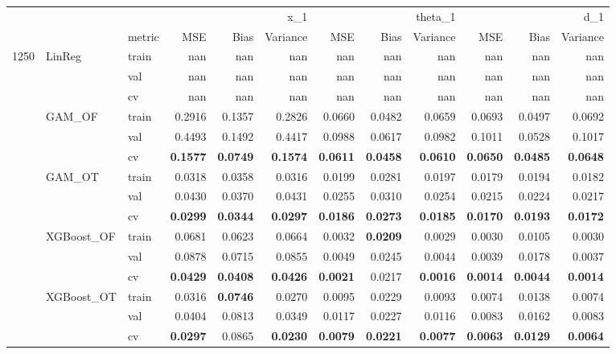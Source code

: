 \begin{tabular}{lllrrrrrrrrr}
 &  &  & \multicolumn{3}{r}{x_1} & \multicolumn{3}{r}{theta_1} & \multicolumn{3}{r}{d_1} \\
 &  & metric & MSE & Bias & Variance & MSE & Bias & Variance & MSE & Bias & Variance \\
\multirow[c]{15}{*}{1250} & \multirow[c]{3}{*}{LinReg} & train & nan & nan & nan & nan & nan & nan & nan & nan & nan \\
 &  & val & nan & nan & nan & nan & nan & nan & nan & nan & nan \\
 &  & cv & nan & nan & nan & nan & nan & nan & nan & nan & nan \\
 & \multirow[c]{3}{*}{GAM_OF} & train & 0.2916 & 0.1357 & 0.2826 & 0.0660 & 0.0482 & 0.0659 & 0.0693 & 0.0497 & 0.0692 \\
 &  & val & 0.4493 & 0.1492 & 0.4417 & 0.0988 & 0.0617 & 0.0982 & 0.1011 & 0.0528 & 0.1017 \\
 &  & cv & \bfseries 0.1577 & \bfseries 0.0749 & \bfseries 0.1574 & \bfseries 0.0611 & \bfseries 0.0458 & \bfseries 0.0610 & \bfseries 0.0650 & \bfseries 0.0485 & \bfseries 0.0648 \\
 & \multirow[c]{3}{*}{GAM_OT} & train & 0.0318 & 0.0358 & 0.0316 & 0.0199 & 0.0281 & 0.0197 & 0.0179 & 0.0194 & 0.0182 \\
 &  & val & 0.0430 & 0.0370 & 0.0431 & 0.0255 & 0.0310 & 0.0254 & 0.0215 & 0.0224 & 0.0217 \\
 &  & cv & \bfseries 0.0299 & \bfseries 0.0344 & \bfseries 0.0297 & \bfseries 0.0186 & \bfseries 0.0273 & \bfseries 0.0185 & \bfseries 0.0170 & \bfseries 0.0193 & \bfseries 0.0172 \\
 & \multirow[c]{3}{*}{XGBoost_OF} & train & 0.0681 & 0.0623 & 0.0664 & 0.0032 & \bfseries 0.0209 & 0.0029 & 0.0030 & 0.0105 & 0.0030 \\
 &  & val & 0.0878 & 0.0715 & 0.0855 & 0.0049 & 0.0245 & 0.0044 & 0.0039 & 0.0178 & 0.0037 \\
 &  & cv & \bfseries 0.0429 & \bfseries 0.0408 & \bfseries 0.0426 & \bfseries 0.0021 & 0.0217 & \bfseries 0.0016 & \bfseries 0.0014 & \bfseries 0.0044 & \bfseries 0.0014 \\
 & \multirow[c]{3}{*}{XGBoost_OT} & train & 0.0316 & \bfseries 0.0746 & 0.0270 & 0.0095 & 0.0229 & 0.0093 & 0.0074 & 0.0138 & 0.0074 \\
 &  & val & 0.0404 & 0.0813 & 0.0349 & 0.0117 & 0.0227 & 0.0116 & 0.0083 & 0.0162 & 0.0083 \\
 &  & cv & \bfseries 0.0297 & 0.0865 & \bfseries 0.0230 & \bfseries 0.0079 & \bfseries 0.0221 & \bfseries 0.0077 & \bfseries 0.0063 & \bfseries 0.0129 & \bfseries 0.0064 \\

\end{tabular}
